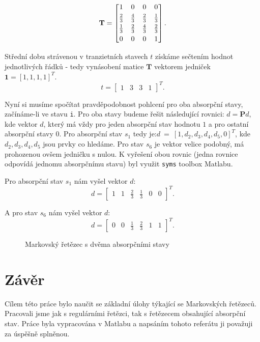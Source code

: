 \documentclass{article}
\begin{document}
\[
\mathbf{T} =
\begin{bmatrix}
1 & 0 & 0 & 0 \\
\addlinespace[3pt]
\frac{2}{3} & \frac{4}{3} & \frac{2}{3} & \frac{1}{3} \\
\addlinespace[3pt]
\frac{1}{3} & \frac{2}{3} & \frac{4}{3} & \frac{2}{3} \\
\addlinespace[3pt]
0 & 0 & 0 & 1 \\
\end{bmatrix}.
\]

Střední dobu strávenou v tranzietních stavech $t$ získáme sečtením hodnot jednotlivých řádků - tedy vynásobení matice $\mathbf{T}$ vektorem jedniček $\mathbf{1} = [1, 1, 1, 1]^T$.
\[
t = 
\begin{bmatrix}
    1 & 3 & 3 & 1
\end{bmatrix}^T.
\]

Nyní si musíme spočítat pravděpodobnost pohlcení pro oba absorpční stavy, začínáme-li ve stavu \verb|i|.
Pro oba stavy budeme řešit následující rovnici: $d = \mathbf{P} d$, kde vektor $d$, který má vždy pro jeden absorpční stav hodnotu $1$ a pro ostatní absorpční stavy $0$. 
Pro absorpční stav $s_1$ tedy je:\linebreak  $d~=~[1, d_2, d_3, d_4, d_5, 0]^T$, kde $d_2, d_3, d_4, d_5$ jsou prvky co hledáme. Pro stav $s_6$ je vektor velice podobný, má prohozenou ovšem jedničku s nulou.
K vyřešení obou rovnic (jedna rovnice odpovídá jednomu absorpčnímu stavu) byl využit \verb|syms| toolbox Matlabu.

Pro absorpční stav $s_1$ nám vyšel vektor $d$:
\[
d = 
\begin{bmatrix}
    1 & 1 &\frac 2 3 & \frac 1 3 & 0 & 0
\end{bmatrix}^T.
\]

A pro stav $s_6$ nám vyšel vektor $d$:
\[
d = 
\begin{bmatrix}
    0 & 0 & \frac 1 3 & \frac 2 3 & 1 & 1
\end{bmatrix}^T.
\]


\begin{figure}
\centering
{}
\caption{Markovský řetězec s dvěma absorpčními stavy}
\label{fig:markov_chain_2}
\end{figure}
\clearpage
\section{Závěr}
Cílem této práce bylo naučit se základní úlohy týkající se Markovských řetězeců. Pracovali jsme jak s regulárními řetězci, tak s řetězecem obsahující absorpční stav. 
Práce byla vypracována v Matlabu a napsáním tohoto referátu ji považuji za úspěšně splněnou.
\end{document}
